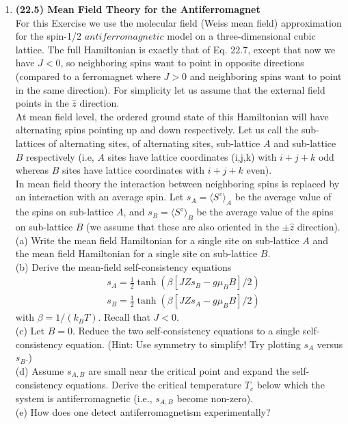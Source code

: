 \documentclass[reqno,a4paper,12pt]{amsart}
\begin{document}
\begin{enumerate}[1.]
\item \textbf{(22.5) Mean Field Theory for the Antiferromagnet} \\
For this Exercise we use the molecular field (Weiss mean field) approximation for the spin-1/2 $antiferromagnetic$ model on a three-dimensional cubic lattice. The full Hamiltonian is exactly that of Eq. 22.7, except that now we have $J<0$, so neighboring spins want to point in opposite directions (compared to a ferromagnet where $J>0$ and neighboring spins want to point in the same direction). For simplicity let us assume that the external field points in the $\hat{z}$ direction. \\
At mean field level, the ordered ground state of this Hamiltonian will have alternating spins pointing up and down respectively. Let us call the sub-lattices of alternating sites, of alternating sites, sub-lattice $A$ and sub-lattice $B$ respectively (i.e, $A$ sites have lattice coordinates (i,j,k) with $i+j+k$ odd whereas $B$ sites have lattice coordinates with $i+j+k$ even). \\
In mean field theory the interaction between neighboring spins is replaced by an interaction with an average spin. Let $s_A = \langle S^z \rangle_A$ be the average value of the spins on sub-lattice $A$, and $s_B = \langle S^z \rangle_B$ be the average value of the spins on sub-lattice $B$ (we assume that these are also oriented in the $\pm \hat{z}$ direction). \\
(a) Write the mean field Hamiltonian for a single site on sub-lattice $A$ and the mean field Hamiltonian for a single site on sub-lattice $B$. \\
(b) Derive the mean-field self-consistency equations 
\begin{align*}
	&s_A = \frac{1}{2} \tanh(\beta[JZs_B - g\mu_BB]/2) \\
	&s_B = \frac{1}{2} \tanh(\beta[JZs_A - g\mu_BB]/2) 
\end{align*}
with $\beta = 1/(k_BT)$. Recall that $J<0$. \\
(c) Let $B = 0$. Reduce the two self-consistency equations to a single self-consistency equation. (Hint: Use symmetry to simplify! Try plotting $s_A$ versus $s_B$.) \\
(d) Assume $s_{A,B}$ are small near the critical point and expand the self-consistency equations. Derive the critical temperature $T_c$ below which the system is antiferromagnetic (i.e., $s_{A,B}$ become non-zero).  \\
(e) How does one detect antiferromagnetism experimentally? \\

\end{enumerate}
\end{document}
